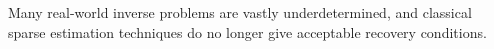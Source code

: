 Many real-world inverse problems are vastly underdetermined, and classical sparse estimation techniques do no longer give acceptable recovery conditions.
